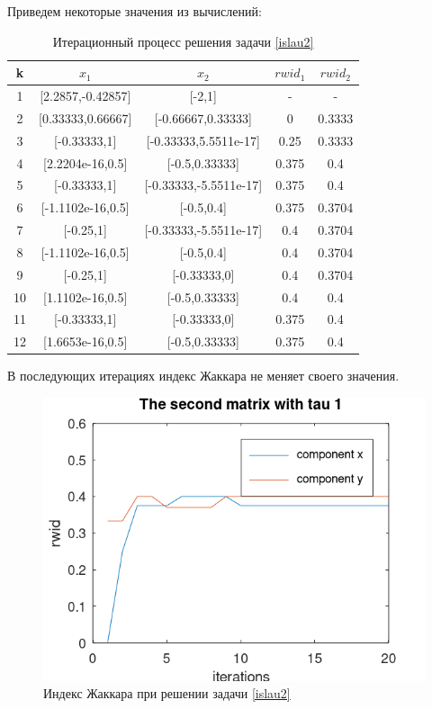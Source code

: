 \documentclass[12pt,a4paper]{article}
\begin{document}
Приведем некоторые значения из вычислений:
\begin{table}[H]
    \centering
    \begin{tabular}{|c|c|c|c|c|}
        \hline
        k & $x_1$ & $x_2$ & $rwid_1$ & $rwid_2$\\\hline
        1 & [2.2857,-0.42857] & [-2,1] & - & -\\\hline
        2 & [0.33333,0.66667] & [-0.66667,0.33333] & 0 & 0.3333\\\hline
        3 & [-0.33333,1] & [-0.33333,5.5511e-17] & 0.25 & 0.3333\\\hline
        4 & [2.2204e-16,0.5] & [-0.5,0.33333] & 0.375 & 0.4\\\hline
        5 & [-0.33333,1] & [-0.33333,-5.5511e-17] & 0.375 & 0.4\\\hline
        6 & [-1.1102e-16,0.5] & [-0.5,0.4] & 0.375 & 0.3704\\\hline
        7 & [-0.25,1] & [-0.33333,-5.5511e-17] & 0.4 & 0.3704\\\hline
        8 & [-1.1102e-16,0.5] & [-0.5,0.4] & 0.4 & 0.3704\\\hline
        9 & [-0.25,1] & [-0.33333,0] & 0.4 & 0.3704\\\hline
        10 & [1.1102e-16,0.5] & [-0.5,0.33333] & 0.4 & 0.4\\\hline
        11 & [-0.33333,1] & [-0.33333,0] & 0.375 & 0.4\\\hline
        12 & [1.6653e-16,0.5] & [-0.5,0.33333] & 0.375 & 0.4\\\hline
    \end{tabular}
    \caption{Итерационный процесс решения задачи \eqref{islau2}}
\end{table}
В последующих итерациях индекс Жаккара не меняет своего значения.

\begin{figure}[H]
    \centering
    \includegraphics[scale=0.6]{Images/rwid2.png}
    \caption{Индекс Жаккара при решении задачи \eqref{islau2}}
\end{figure}
\end{document}
